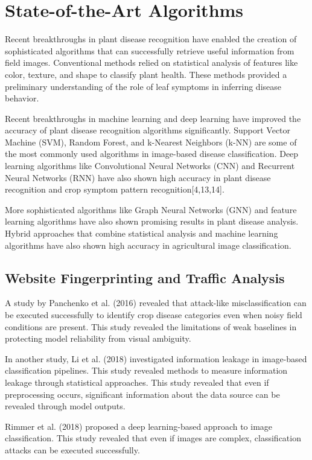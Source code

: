 \documentclass[12pt,a4paper]{report}
\begin{document}
\section{State-of-the-Art Algorithms}
Recent breakthroughs in plant disease recognition have enabled the creation of sophisticated algorithms that can successfully retrieve useful information from field images. Conventional methods relied on statistical analysis of features like color, texture, and shape to classify plant health. These methods provided a preliminary understanding of the role of leaf symptoms in inferring disease behavior.

Recent breakthroughs in machine learning and deep learning have improved the accuracy of plant disease recognition algorithms significantly. Support Vector Machine (SVM), Random Forest, and k-Nearest Neighbors (k-NN) are some of the most commonly used algorithms in image-based disease classification. Deep learning algorithms like Convolutional Neural Networks (CNN) and Recurrent Neural Networks (RNN) have also shown high accuracy in plant disease recognition and crop symptom pattern recognition[4,13,14].

More sophisticated algorithms like Graph Neural Networks (GNN) and feature learning algorithms have also shown promising results in plant disease analysis. Hybrid approaches that combine statistical analysis and machine learning algorithms have also shown high accuracy in agricultural image classification.

\subsection{Website Fingerprinting and Traffic Analysis}

A study by Panchenko et al. (2016) revealed that attack-like misclassification can be executed successfully to identify crop disease categories even when noisy field conditions are present. This study revealed the limitations of weak baselines in protecting model reliability from visual ambiguity.

In another study, Li et al. (2018) investigated information leakage in image-based classification pipelines. This study revealed methods to measure information leakage through statistical approaches. This study revealed that even if preprocessing occurs, significant information about the data source can be revealed through model outputs.

Rimmer et al. (2018) proposed a deep learning-based approach to image classification. This study revealed that even if images are complex, classification attacks can be executed successfully.
\end{document}
